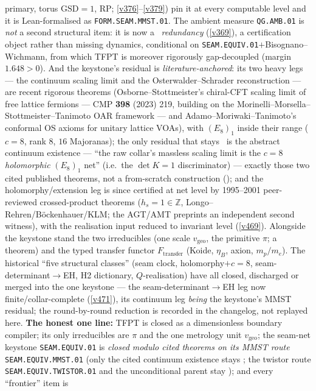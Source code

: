 \documentclass[11pt,a4paper]{article}
\newcommand{\Z}{\mathbb Z}
\begin{document}
\begin{keybox}
primary, torus $\mathrm{GSD}{=}1$, RP; \vref{v376}--\vref{v379}) pin it at every computable level and it is
Lean-formalised as \texttt{FORM.SEAM.MMST.01}.  The ambient measure
\texttt{QG.AMB.01} is \emph{not} a second structural item: it is now a \mC\ \emph{redundancy} (\vref{v369}), a
certification object rather than missing dynamics, conditional on \texttt{SEAM.EQUIV.01}${+}$Bisognano--Wichmann,
from which TFPT is moreover rigorously gap-decoupled (margin $1.648>0$).  And the keystone's residual is
\emph{literature-anchored}: its two heavy legs ---
the continuum scaling limit and the Osterwalder--Schrader reconstruction --- are recent rigorous theorems
(Osborne--Stottmeister's chiral-CFT scaling limit of free lattice fermions --- CMP \textbf{398} (2023) 219,
building on the Morinelli--Morsella--Stottmeister--Tanimoto OAR framework --- and
Adamo--Moriwaki--Tanimoto's conformal OS axioms for unitary lattice VOAs), with $(E_8)_1$ inside their range
($c{=}8$, rank $8$, $16$ Majoranas); the only residual that stays \mO\ is the abstract continuum existence ---
``the raw collar's massless scaling limit is the $c{=}8$ \emph{holomorphic} $(E_8)_1$ net'' (i.e.\ the $\det K{=}1$
discriminator) --- exactly those two cited published theorems, not a from-scratch
construction (); and the holomorphy/extension leg is since certified at net
level by 1995--2001 peer-reviewed crossed-product theorems ($h_s{=}1{\in}\Z$, Longo--Rehren/B\"ockenhauer/KLM;
the AGT/AMT preprints an independent second witness), with the realisation input reduced to invariant level
(\vref{v469}).  Alongside the keystone stand the two irreducibles (one scale
$v_{\mathrm{geo}}$, the primitive $\pi$; a theorem) and the typed transfer functor $F_{\mathrm{transfer}}$ (Koide,
$\eta_B$, axion, $m_p/m_e$). The historical ``five structural classes'' (seam clock, holomorphy$+c{=}8$,
seam-determinant$\to$EH, H2 dictionary, $Q$-realisation) have all closed, discharged or merged into the one
keystone --- the seam-determinant$\to$EH leg now finite/collar-complete (\vref{v471}), its continuum leg
\emph{being} the keystone's MMST residual; the round-by-round reduction is recorded in the changelog, not
replayed here.
\textbf{The honest one line:} TFPT is closed as a dimensionless boundary compiler; its only irreducibles
are $\pi$ and the one metrology unit $v_{\mathrm{geo}}$; the seam-net keystone \texttt{SEAM.EQUIV.01} is
\emph{closed modulo cited theorems on its MMST route} \texttt{SEAM.EQUIV.MMST.01} (only the cited continuum existence
stays \mO; the twistor route \texttt{SEAM.EQUIV.TWISTOR.01} and the unconditional parent stay \mO); and every ``frontier'' item is

\end{keybox}
\end{document}
